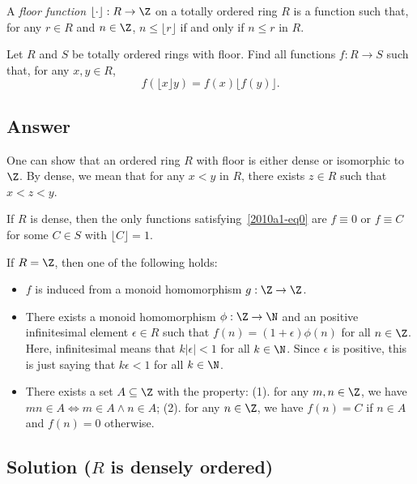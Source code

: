 A \emph{floor function} $\lfloor \cdot \rfloor : R \to \Z$ on a totally ordered ring $R$ is a function such that, for any $r \in R$ and $n \in \Z$, $n \leq \lfloor r \rfloor$ if and only if $n \leq r$ in $R$.

Let $R$ and $S$ be totally ordered rings with floor.
Find all functions $f : R \to S$ such that, for any $x, y \in R$,
\[ f(\lfloor x \rfloor y) = f(x) \lfloor f(y) \rfloor. \tag{*}\label{2010a1-eq0} \]



\subsection*{Answer}

One can show that an ordered ring $R$ with floor is either dense or isomorphic to $\Z$.
By dense, we mean that for any $x < y$ in $R$, there exists $z \in R$ such that $x < z < y$.

If $R$ is dense, then the only functions satisfying~\eqref{2010a1-eq0} are $f \equiv 0$ or $f \equiv C$ for some $C \in S$ with $\lfloor C \rfloor = 1$.

If $R = \Z$, then one of the following holds:
\begin{itemize}

    \item
    $f$ is induced from a monoid homomorphism $g : \Z \to \Z$.
    
    \item
    There exists a monoid homomorphism $\phi : \Z \to \N$ and an positive infinitesimal element $\epsilon \in R$ such that $f(n) = (1 + \epsilon) \phi(n)$ for all $n \in \Z$.
    Here, infinitesimal means that $k |\epsilon| < 1$ for all $k \in \N$.
    Since $\epsilon$ is positive, this is just saying that $k \epsilon < 1$ for all $k \in \N$.

    \item
    There exists a set $A \subseteq \Z$ with the property:
    (1). for any $m, n \in \Z$, we have $mn \in A \iff m \in A \wedge n \in A$;
    (2). for any $n \in \Z$, we have $f(n) = C$ if $n \in A$ and $f(n) = 0$ otherwise.

\end{itemize}





\subsection*{Solution ($R$ is densely ordered)}

